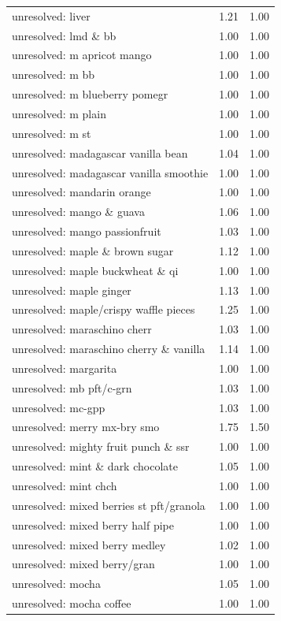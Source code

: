 \begin{table}
\begin{tabular}{lrr}
unresolved: liver & 1.21 & 1.00 \\
unresolved: lmd \& bb & 1.00 & 1.00 \\
unresolved: m apricot mango & 1.00 & 1.00 \\
unresolved: m bb & 1.00 & 1.00 \\
unresolved: m blueberry pomegr & 1.00 & 1.00 \\
unresolved: m plain & 1.00 & 1.00 \\
unresolved: m st & 1.00 & 1.00 \\
unresolved: madagascar vanilla bean & 1.04 & 1.00 \\
unresolved: madagascar vanilla smoothie & 1.00 & 1.00 \\
unresolved: mandarin orange & 1.00 & 1.00 \\
unresolved: mango \& guava & 1.06 & 1.00 \\
unresolved: mango passionfruit & 1.03 & 1.00 \\
unresolved: maple \& brown sugar & 1.12 & 1.00 \\
unresolved: maple buckwheat \& qi & 1.00 & 1.00 \\
unresolved: maple ginger & 1.13 & 1.00 \\
unresolved: maple/crispy waffle pieces & 1.25 & 1.00 \\
unresolved: maraschino cherr & 1.03 & 1.00 \\
unresolved: maraschino cherry \& vanilla & 1.14 & 1.00 \\
unresolved: margarita & 1.00 & 1.00 \\
unresolved: mb pft/c-grn & 1.03 & 1.00 \\
unresolved: mc-gpp & 1.03 & 1.00 \\
unresolved: merry mx-bry smo & 1.75 & 1.50 \\
unresolved: mighty fruit punch \& ssr & 1.00 & 1.00 \\
unresolved: mint \& dark chocolate & 1.05 & 1.00 \\
unresolved: mint chch & 1.00 & 1.00 \\
unresolved: mixed berries st pft/granola & 1.00 & 1.00 \\
unresolved: mixed berry half pipe & 1.00 & 1.00 \\
unresolved: mixed berry medley & 1.02 & 1.00 \\
unresolved: mixed berry/gran & 1.00 & 1.00 \\
unresolved: mocha & 1.05 & 1.00 \\
unresolved: mocha coffee & 1.00 & 1.00 \\

\end{tabular}
\end{table}
